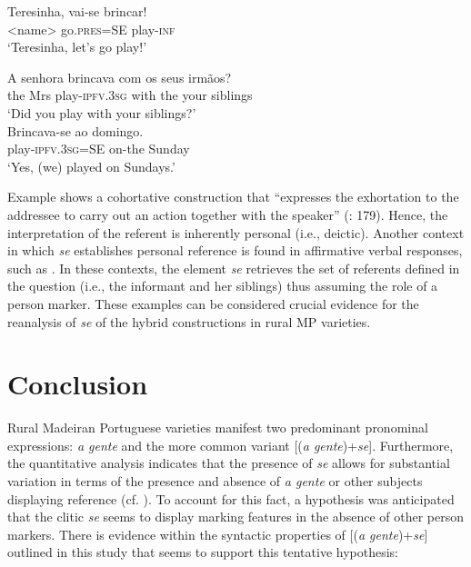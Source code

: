 \documentclass[output=paper]{langscibook}
\begin{document}
\ea\label{ex:henriques:39}
 \gll Teresinha, vai-se brincar!\\
         <name> go.\textsc{pres}=SE play-\textsc{inf}\\
 \glt `Teresinha, let's go play!'
\ex
 \begin{xlist}\label{ex:henriques:40}
 \gll A senhora brincava com os seus irmãos?\\
         the Mrs play-\textsc{ipfv.3sg} with the your siblings\\
 \glt `Did you play with your siblings?'\\
 \gll Brincava-se ao domingo.\\
         play-\textsc{ipfv.3sg}=SE on-the Sunday\\
 \glt `Yes, (we) played on Sundays.'
 \end{xlist}
\z 

Example  shows a cohortative construction that “expresses the exhortation to the addressee to carry out an action together with the speaker” (\citealt{DobrushinaGoussev2005}: 179). Hence, the interpretation of the referent is inherently personal (i.e., deictic). Another context in which \textit{se} establishes personal  reference is found in affirmative verbal responses, such as . In these contexts, the element \textit{se} retrieves the set of referents defined in the question (i.e., the informant and her siblings) thus assuming the role of a  person marker. These examples can be considered crucial evidence for the reanalysis of \textit{se} of the hybrid constructions in rural MP varieties. 


\section{Conclusion}\label{sec:henriques:6}
Rural Madeiran Portuguese varieties manifest two predominant  pronominal expressions: \textit{a gente} and the more common variant [(\textit{a gente})+\textit{se}]. Furthermore, the quantitative analysis indicates that the presence of \textit{se} allows for substantial variation in terms of the presence and absence of \textit{a gente} or other subjects displaying  reference (cf. ). To account for this fact, a hypothesis was anticipated that the clitic \textit{se} seems to display  marking features in the absence of other person markers. There is evidence within the syntactic properties of [(\textit{a gente})+\textit{se}] outlined in this study that seems to support this tentative hypothesis:
\end{document}
